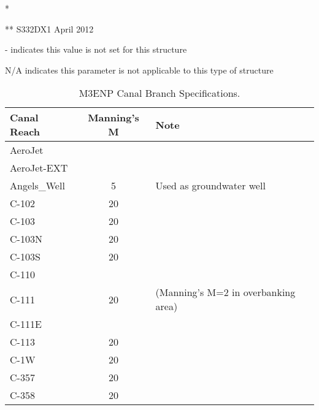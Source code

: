 \begin{table}[h]
* \cite{corp2005}

** S332DX1 April 2012

- indicates this value is not set for this structure

N/A indicates this parameter is not applicable to this type of structure
\end{table}
\normalsize

\clearpage




\begin{table}[!h]
\caption{M3ENP Canal Branch Specifications.}
\label{tab:canals}
\begin{tabular}{lcl}
\hline
Canal Reach        & Manning's M  & Note                                        \\
\hline
AeroJet            &              &                                             \\
AeroJet-EXT        &              &                                             \\
Angels\_Well       & 5            & Used as groundwater well                    \\
C-102              & 20           &                                             \\
C-103              & 20           &                                             \\
C-103N             & 20           &                                             \\
C-103S             & 20           &                                             \\
C-110              &              &                                             \\
C-111              & 20           & (Manning's M=2 in overbanking area)         \\
C-111E             &              &                                             \\
C-113              & 20           &                                             \\
C-1W               & 20           &                                             \\
C-357              & 20           &                                             \\
C-358              & 20           &                                             \\

\end{tabular}
\end{table}
